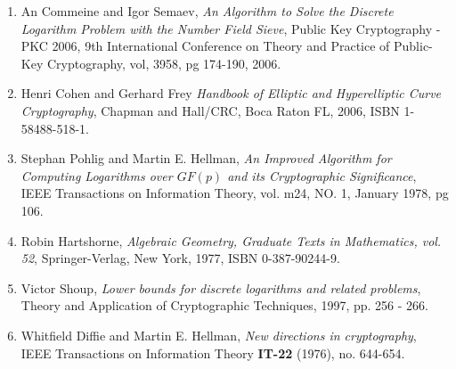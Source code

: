 \begin{enumerate}[1]
	\item \label{NFStoDLP} An Commeine and Igor Semaev, \textit{An Algorithm to Solve the Discrete Logarithm Problem with the Number Field Sieve}, Public Key Cryptography - PKC 2006, 9th International Conference on Theory and Practice of Public-Key Cryptography, vol, 3958, pg 174-190, 2006. 

	\item \label{TheHandbook} Henri Cohen and Gerhard Frey \textit{Handbook of Elliptic and Hyperelliptic Curve Cryptography}, Chapman and Hall/CRC, Boca Raton FL, 2006, ISBN 1-58488-518-1.

	\item \label{PohligHellman} Stephan Pohlig and Martin E. Hellman, \textit{An Improved Algorithm for Computing Logarithms over $GF(p)$ and its Cryptographic Significance}, IEEE Transactions on Information Theory, vol. m24, NO. 1, January 1978, pg 106. 
	\item \label{Hartshorne} Robin Hartshorne, \textit{Algebraic Geometry, Graduate Texts in Mathematics, vol. 52}, Springer-Verlag, New York, 1977, ISBN 0-387-90244-9.   
	
	\item \label{VictorShoup} Victor Shoup, \textit{Lower bounds for discrete logarithms and related problems}, Theory and Application of Cryptographic Techniques, 1997, pp. 256 - 266. 
	
	\item \label{WhitfieldDiffieMartinHellman} Whitfield Diffie and Martin E. Hellman, \textit{New directions in cryptography}, IEEE Transactions on Information Theory \textbf{IT-22} (1976), no. 644-654.  	
\end{enumerate}